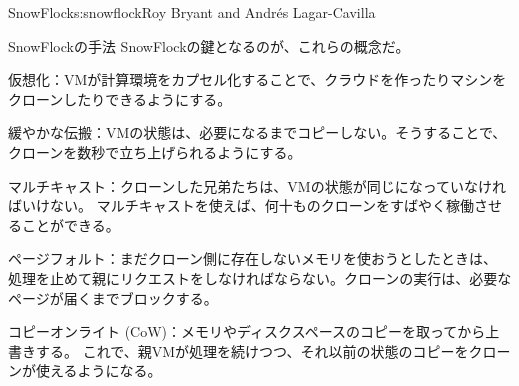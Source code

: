 \begin{aosachapter}{SnowFlock}{s:snowflock}{Roy Bryant and Andr\'e{s} Lagar-Cavilla}
\begin{aosasect1}{SnowFlockの手法}
SnowFlockの鍵となるのが、これらの概念だ。

\begin{aosaitemize}

  \item 仮想化：VMが計算環境をカプセル化することで、クラウドを作ったりマシンをクローンしたりできるようにする。

  \item 緩やかな伝搬：VMの状態は、必要になるまでコピーしない。そうすることで、クローンを数秒で立ち上げられるようにする。

  \item マルチキャスト：クローンした兄弟たちは、VMの状態が同じになっていなければいけない。
  マルチキャストを使えば、何十ものクローンをすばやく稼働させることができる。

  \item ページフォルト：まだクローン側に存在しないメモリを使おうとしたときは、
  処理を止めて親にリクエストをしなければならない。クローンの実行は、必要なページが届くまでブロックする。

  \item コピーオンライト (CoW)：メモリやディスクスペースのコピーを取ってから上書きする。
  これで、親VMが処理を続けつつ、それ以前の状態のコピーをクローンが使えるようになる。

\end{aosaitemize}


\end{aosasect1}
\end{aosachapter}
